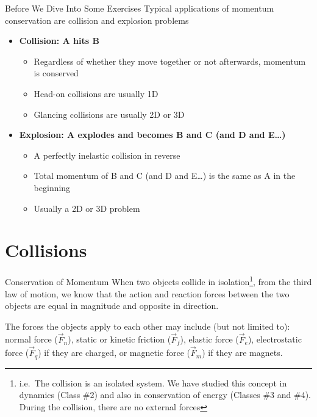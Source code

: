 \documentclass[12pt,compress,aspectratio=169]{beamer}
\begin{document}
\begin{frame}{Before We Dive Into Some Exercises}
  Typical applications of momentum conservation are collision and explosion
  problems
  \begin{itemize}
  \item\textbf{Collision: A hits B}
    \begin{itemize}
    \item Regardless of whether they move together or not afterwards, momentum
      is conserved
    \item Head-on collisions are usually 1D
    \item Glancing collisions are usually 2D or 3D
    \end{itemize}
  \item\textbf{Explosion: A explodes and becomes B and C (and D and E\ldots)}
    \begin{itemize}
    \item A perfectly inelastic collision in reverse
    \item Total momentum of B and C (and D and E\ldots) is the same as A in the
      beginning
    \item Usually a 2D or 3D problem
    \end{itemize}
  \end{itemize}
\end{frame}



\section{Collisions}

\begin{frame}{Conservation of Momentum}
  When two objects collide in isolation\footnote{i.e.\ The collision is an
  isolated system. We have studied this concept in dynamics (Class \#2) and
  also in conservation of energy (Classes \#3 and \#4). During the collision,
  there are no external forces}, from the third law of motion, we know that the
  action and reaction forces between the two objects are equal in magnitude and
  opposite in direction.
  
  The forces the objects apply to each other may include (but not limited to):
  normal force ($\vec F_n$), static or kinetic friction ($\vec F_f$), elastic
  force ($\vec F_e$), electrostatic force ($\vec F_q$) if they are charged, or
  magnetic force ($\vec F_m$) if they are magnets.
  \vspace{.2in}
\end{frame}
\end{document}
